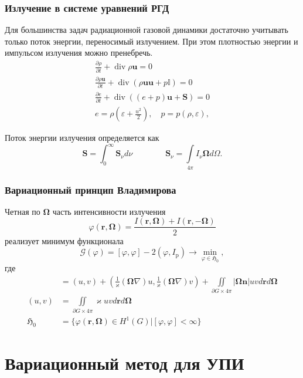 \documentclass[unicode,aspectratio=43]{beamer}
\newcommand{\I}{\mathrm{\mathit{I}}}
\newcommand{\Ip}{\mathrm{\mathit{I}}_\text{p}}
\renewcommand{\vec}[1]{\boldsymbol{\mathbf{#1}}}
\newcommand{\pd}[2]{\frac{\partial #1}{\partial #2}}
\renewcommand{\div}{\operatorname{div}}
\begin{document}
\begin{frame}\frametitle{Излучение в системе уравнений РГД}
	Для большинства задач радиационной газовой динамики достаточно учитывать только поток энергии, переносимый излучением. При этом плотностью энергии и импульсом излучения можно пренебречь.
	\[
	\begin{gathered}
	\pd{\rho}{t} + \div \rho \vec u = 0\\
	\pd{\rho \vec u}{t} + \div \left(\rho \vec u \vec u + p \mathbb I\right) = 0\\
	\pd{e}{t} + \div \left((e + p)\vec u + \vec S \right) = 0\\
	e = \rho \left(\varepsilon + \frac{u^2}{2}\right),\quad  p = p(\rho, \varepsilon),
	\end{gathered}
	\]

	Поток энергии излучения определяется как
	\[
	\vec S = \int_0^\infty \vec S_\nu d\nu \qquad\qquad
	\vec S_\nu = \int\limits_{4\pi} \I_\nu \vec \Omega d\Omega.
	\]
\end{frame}

\begin{frame}\frametitle{Вариационный принцип Владимирова}
	Четная по $\vec \Omega$ часть интенсивности излучения
	\[
	\varphi(\vec r, \vec \Omega) = \frac{\I(\vec r, \vec \Omega) + \I(\vec r, -\vec \Omega)}{2}
	\]
	реализует минимум функционала
	\[
	\mathcal{G}(\varphi) = [\varphi, \varphi] - 2(\varphi, \Ip) \to \min_{\varphi \in \mathfrak{H}_0},
	\]
	где
	\begin{align*}
	[u,v] &= (u, v) + \left(\frac{1}{\varkappa}(\vec \Omega \nabla) u, \frac{1}{\varkappa}(\vec \Omega \nabla) v\right)
	+ \iint\limits_{\partial G \times 4\pi} |\vec \Omega \vec n|uv d \vec r d\vec \Omega\\
	(u,v) &= \iint\limits_{\partial G \times 4\pi} \varkappa uv d \vec r d\vec
\Omega\\
	\mathfrak H_0 &= \Big\{\varphi(\vec r, \vec \Omega) \in H^{1}(G) \Big|
[\varphi, \varphi] < \infty\Big\}
	\end{align*}

\end{frame}

\section{Вариационный метод для УПИ}
\end{document}

